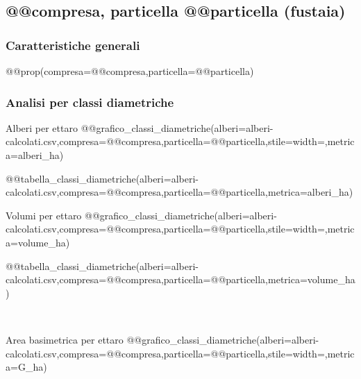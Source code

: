 \subsection*{@@compresa, particella @@particella (fustaia)}

{\footnotesize

\subsubsection*{Caratteristiche generali}
@@prop(compresa=@@compresa,particella=@@particella)

\subsubsection*{Analisi per classi diametriche}

\begin{minipage}[t][][c]{0.5\textwidth}
    \noindent \textsf{Alberi per ettaro}
    @@grafico_classi_diametriche(alberi=alberi-calcolati.csv,compresa=@@compresa,particella=@@particella,stile=width=\textwidth,metrica=alberi_ha)
    \begingroup
        \setlength{\LTleft}{0pt}
        \begin{flushright}
            @@tabella_classi_diametriche(alberi=alberi-calcolati.csv,compresa=@@compresa,particella=@@particella,metrica=alberi_ha)
        \end{flushright}
    \endgroup
\end{minipage}%
\hfill
\begin{minipage}[t][][c]{0.5\textwidth}
    \noindent \textsf{Volumi per ettaro}
    @@grafico_classi_diametriche(alberi=alberi-calcolati.csv,compresa=@@compresa,particella=@@particella,stile=width=\textwidth,metrica=volume_ha)
    \begingroup
        \setlength{\LTleft}{0pt}
        \begin{flushright}
            @@tabella_classi_diametriche(alberi=alberi-calcolati.csv,compresa=@@compresa,particella=@@particella,metrica=volume_ha)
        \end{flushright}
    \endgroup
\end{minipage}
\\
\begin{minipage}[t][][c]{0.5\textwidth}
    \noindent \textsf{Area basimetrica per ettaro}
    @@grafico_classi_diametriche(alberi=alberi-calcolati.csv,compresa=@@compresa,particella=@@particella,stile=width=\textwidth,metrica=G_ha)
    \begingroup
        \setlength{\LTleft}{0pt}
        \begin{flushright}

\end{flushright}
\end{minipage}}
